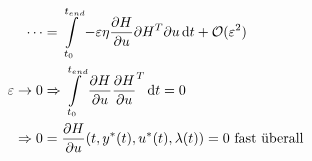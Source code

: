 \begin{align*}
\cdots &= \int\limits_{t_0}^{t_{end}} - \varepsilon \eta \frac{\partial H}{\partial u}{\partial H^T}{\partial u} \,\mathrm d t + \mathcal O(\varepsilon^2) \\
\varepsilon \to 0 & \Rightarrow \int\limits_{t_0}^{t_{end}} \frac{\partial H}{\partial u} \frac{\partial H}{\partial u}^T \,\mathrm d t = 0 \\
\Rightarrow 0 &= \frac{\partial H}{\partial u} (t, y^*(t), u^*(t), \lambda(t)) = 0 \text{ fast überall } \\
\end{align*}




















